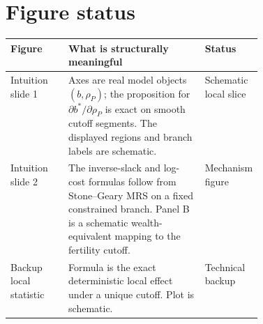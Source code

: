 \documentclass[11pt]{article}
\newcommand{\rhoP}{\rho_P}
\theoremstyle{remark}
\begin{document}
\section*{Figure status}

\begin{tabularx}{\linewidth}{@{}L{0.23\linewidth}Y L{0.19\linewidth}@{}}
\toprule
Figure & What is structurally meaningful & Status \\
\midrule
Intuition slide 1 & Axes are real model objects \((b,\rhoP)\); the proposition for \(\partial b^*/\partial\rhoP\) is exact on smooth cutoff segments.  The displayed regions and branch labels are schematic. & Schematic local slice \\
Intuition slide 2 & The inverse-slack and log-cost formulas follow from Stone--Geary MRS on a fixed constrained branch.  Panel B is a schematic wealth-equivalent mapping to the fertility cutoff. & Mechanism figure \\
Backup local statistic & Formula is the exact deterministic local effect under a unique cutoff.  Plot is schematic. & Technical backup \\
\bottomrule
\end{tabularx}
\end{document}
